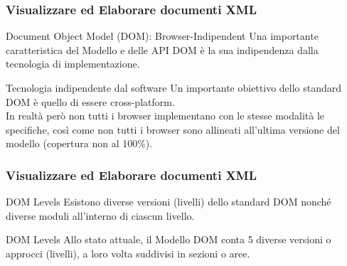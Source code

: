 \begin{frame}
    \frametitle{Visualizzare ed Elaborare documenti XML}
    \addtocounter{nframe}{1}
    

     \begin{block}{Document Object Model (DOM): Browser-Indipendent}
        Una importante caratteristica del Modello e delle API DOM è la sua indipendenza dalla tecnologia di implementazione.
        
     \end{block}

     \begin{block}{Tecnologia indipendente dal software}
        Un importante obiettivo dello standard DOM è quello di essere cross-platform. 
        \\In realtà però non tutti i browser implementano con le stesse modalità le specifiche, così come non tutti i browser sono allineati all'ultima versione del modello (copertura non al 100\%).
       
     \end{block}
     
\end{frame}


\begin{frame}
    \frametitle{Visualizzare ed Elaborare documenti XML}
    \addtocounter{nframe}{1}
    

     \begin{block}{DOM Levels}
       Esistono diverse versioni (livelli) dello standard DOM nonché diverse moduli all'interno di ciascun livello.
     \end{block}

     \begin{block}{DOM Levels}
       Allo stato attuale, il Modello DOM conta 5 diverse versioni o approcci (livelli), a loro volta suddivisi in sezioni o aree.
     \end{block}
     
\end{frame}

